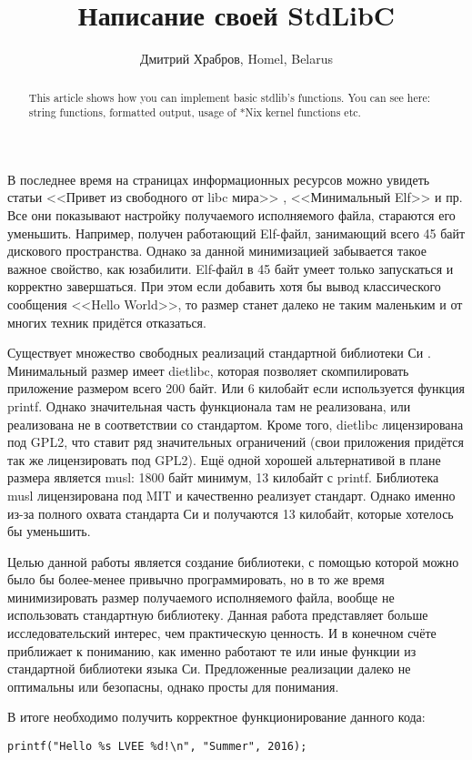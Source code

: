\documentclass[10pt, a5paper]{article}
\begin{document}
\title{Написание своей StdLibC}
\author{Дмитрий Храбров, Homel, Belarus}
\maketitle
\begin{abstract}
This article shows how you can implement basic stdlib's functions. You can see here: string functions, formatted output, usage of *Nix kernel functions etc.
\end{abstract}
В последнее время на страницах информационных ресурсов можно увидеть статьи <<Привет из свободного от libc мира>> \footnotemark[1], <<Минимальный Elf>> \footnotemark[2] и пр. Все они показывают настройку получаемого исполняемого файла, стараются его уменьшить. Например, получен работающий Elf-файл, занимающий всего 45 байт дискового пространства. Однако за данной минимизацией забывается такое важное свойство, как юзабилити. Elf-файл в 45 байт умеет только запускаться и корректно завершаться. При этом если добавить хотя бы вывод классического сообщения <<Hello World>>, то размер станет далеко не таким маленьким и от многих техник придётся отказаться.

Существует множество свободных реализаций стандартной библиотеки Си \footnotemark[3]. Минимальный размер имеет dietlibc, которая позволяет скомпилировать приложение размером всего 200 байт. Или 6 килобайт если используется функция printf. Однако значительная часть функционала там не реализована, или реализована не в соответствии со стандартом. Кроме того, dietlibc лицензирована под GPL2, что ставит ряд значительных ограничений (свои приложения придётся так же лицензировать под GPL2). Ещё одной хорошей альтернативой в плане размера является musl: 1800 байт минимум, 13 килобайт с printf. Библиотека musl лицензирована под MIT и качественно реализует стандарт. Однако именно из-за полного охвата стандарта Си и получаются 13 килобайт, которые хотелось бы уменьшить.

Целью данной работы является создание библиотеки, с помощью которой можно было бы более-менее привычно программировать, но в то же время минимизировать размер получаемого исполняемого файла, вообще не использовать стандартную библиотеку. Данная работа представляет больше исследовательский интерес, чем практическую ценность. И в конечном счёте приближает к пониманию, как именно работают те или иные функции из стандартной библиотеки языка Си. Предложенные реализации далеко не оптимальны или безопасны, однако просты для понимания.

В итоге необходимо получить корректное функционирование \linebreak данного кода:
\lstset{ %
anguage=C,                 %
basicstyle=\small\sffamily, %
breaklines=true,           %
breakatwhitespace=false, %
}
\begin{lstlisting}
printf("Hello %s LVEE %d!\n", "Summer", 2016);
\end{lstlisting}
\end{document}
